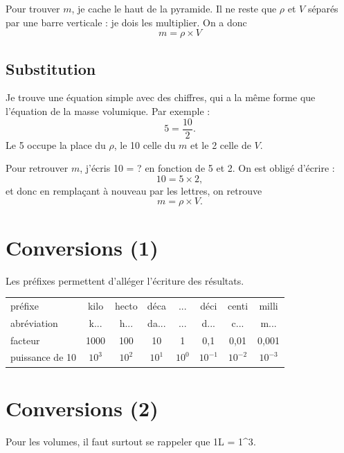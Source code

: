 \begin{conseil}
Pour trouver $m$, je cache le haut de la pyramide.
Il ne reste que $\rho$ et $V$ séparés par une barre verticale : je dois les multiplier.
On a donc
\begin{equation}
m = \rho \times V
\nonumber
\end{equation}
\end{conseil}

\subsection*{Substitution}

\begin{conseil}
Je trouve une équation simple avec des chiffres, qui a la même forme que l'équation de la masse volumique.
Par exemple :
\begin{equation}
5 = \frac{10}{2}.
\nonumber
\end{equation}
Le 5 occupe la place du $\rho$, le 10 celle du $m$ et le 2 celle de $V$.

Pour retrouver $m$, j'écris 10 = ? en fonction de 5 et 2.
On est obligé d'écrire :
\begin{equation}
10 = 5 \times 2,
\nonumber
\end{equation}
et donc en remplaçant à nouveau par les lettres, on retrouve
\begin{equation}
m = \rho \times V.
\nonumber
\end{equation}
\end{conseil}

\section*{Conversions (1)}

Les préfixes permettent d'alléger l'écriture des résultats.

\begin{table}[h]
\center
\begin{tabular}{l|c|c|c|c|c|c|c}
préfixe         & kilo & hecto& déca & ...  & déci & centi& milli\\
abréviation     & k... & h... & da...& ...  & d... & c... & m... \\
facteur         & 1000 & 100  & 10   & 1    & 0{,}1& 0{,}01& 0{,}001 \\
puissance de 10 &$10^3$&$10^2$&$10^1$&$10^0$&$10^{-1}$&$10^{-2}$&$10^{-3}$ 
\end{tabular}
\end{table}

\section*{Conversions (2)}

\begin{conseil}
Pour les volumes, il faut surtout se rappeler que \unit{1}{L} = \unit{1}{\deci\meter^3}.
\end{conseil}


